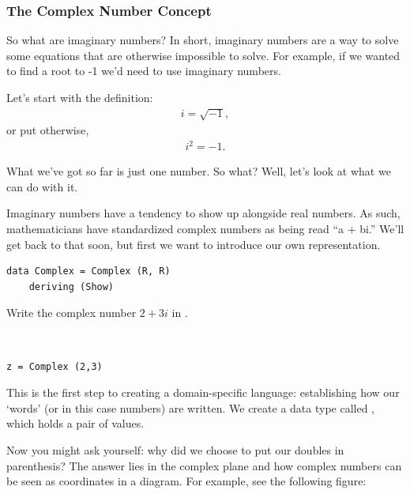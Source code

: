 \subsubsection{The Complex Number Concept}
So what are imaginary numbers? 
In short, imaginary numbers are a way to solve some equations that are otherwise impossible to solve. For example, if we wanted to find a root to -1 we'd need to use imaginary numbers. 


Let's start with the definition:
\begin{align*}
    i = \sqrt{-1},
\end{align*}
or put otherwise, 
\begin{align*}
    i^2 = -1.
\end{align*}

What we've got so far is just one number. So what? Well, let's look at what we can do with it. 

Imaginary numbers have a tendency to show up alongside real numbers. As such, mathematicians have standardized complex numbers as being read ``a + bi.'' 
We'll get back to that soon, but first we want to introduce our own representation. 

\begin{verbatim}
data Complex = Complex (R, R)
    deriving (Show)
\end{verbatim}

\begin{example}
Write the complex number $2+3i$ in .
\end{example}
\begin{solution} ~\\ 
\begin{verbatim}
z = Complex (2,3)
\end{verbatim}
\end{solution}

This is the first step to creating a domain-specific language: establishing how our `words' (or in this case numbers) are written. We create a data type called , which holds a pair of values. 

Now you might ask yourself: why did we choose to put our doubles in parenthesis? The answer lies in the complex plane and how complex numbers can be seen as coordinates in a diagram. For example, see the following figure:

